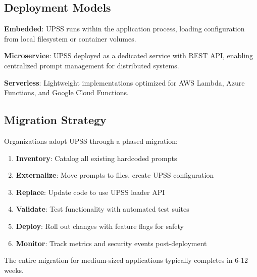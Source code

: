 \subsection{Deployment Models}

\textbf{Embedded}: UPSS runs within the application process, loading configuration from local filesystem or container volumes.

\textbf{Microservice}: UPSS deployed as a dedicated service with REST API, enabling centralized prompt management for distributed systems.

\textbf{Serverless}: Lightweight implementations optimized for AWS Lambda, Azure Functions, and Google Cloud Functions.

\subsection{Migration Strategy}

Organizations adopt UPSS through a phased migration:

\begin{enumerate}
    \item \textbf{Inventory}: Catalog all existing hardcoded prompts
    \item \textbf{Externalize}: Move prompts to files, create UPSS configuration
    \item \textbf{Replace}: Update code to use UPSS loader API
    \item \textbf{Validate}: Test functionality with automated test suites
    \item \textbf{Deploy}: Roll out changes with feature flags for safety
    \item \textbf{Monitor}: Track metrics and security events post-deployment
\end{enumerate}

The entire migration for medium-sized applications typically completes in 6-12 weeks.
